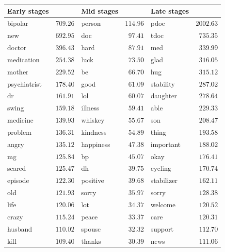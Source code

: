 \begin{table}[p]
    \centering
    \small
    \begin{tabular}{lrlrlr}
     \toprule
    Early stages &        & Mid stages &        & Late stages &         \\
    \midrule
          bipolar & $709.26$ &     person & $114.96$ &        pdoc & $2002.63$ \\
              new & $692.95$ &        doc & $ 97.41$ &        tdoc & $ 735.35$ \\
           doctor & $396.43$ &       hard & $ 87.91$ &         med & $ 339.99$ \\
       medication & $254.38$ &       luck & $ 73.50$ &        glad & $ 316.05$ \\
           mother & $229.52$ &         be & $ 66.70$ &         hug & $ 315.12$ \\
     psychiatrist & $178.40$ &       good & $ 61.09$ &   stability & $ 287.02$ \\
               dr & $161.91$ &        lol & $ 60.07$ &    daughter & $ 278.64$ \\
            swing & $159.18$ &    illness & $ 59.41$ &        able & $ 229.33$ \\
         medicine & $139.93$ &    whiskey & $ 55.67$ &         son & $ 208.47$ \\
          problem & $136.31$ &   kindness & $ 54.89$ &       thing & $ 193.58$ \\
            angry & $135.12$ &  happiness & $ 47.38$ &   important & $ 188.02$ \\
               mg & $125.84$ &         bp & $ 45.07$ &        okay & $ 176.41$ \\
           scared & $125.47$ &         dh & $ 39.75$ &     cycling & $ 170.74$ \\
          episode & $122.30$ &   positive & $ 39.68$ &  stabilizer & $ 162.11$ \\
              old & $121.93$ &      sorry & $ 35.97$ &       sorry & $ 128.38$ \\
             life & $120.06$ &        lot & $ 34.37$ &     welcome & $ 120.52$ \\
            crazy & $115.24$ &      peace & $ 33.37$ &        care & $ 120.31$ \\
          husband & $110.02$ &     spouse & $ 32.32$ &     support & $ 112.70$ \\
             kill & $109.40$ &     thanks & $ 30.39$ &        news & $ 111.06$ \\

\end{tabular}
\end{table}
